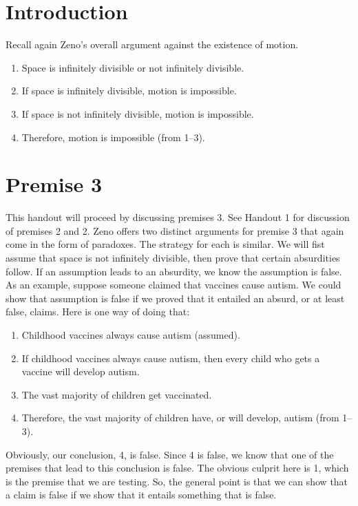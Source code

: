 \documentclass[oneside]{article}
\begin{document}
\thispagestyle{fancy}



\section{Introduction}

Recall again Zeno's overall argument against the existence of motion. 

\begin{enumerate}
\item Space is infinitely divisible or not infinitely divisible.
\item  If space is infinitely divisible, motion is impossible.
\item  If space is not infinitely divisible, motion is impossible.
\item  Therefore, motion is impossible (from 1--3).
\end{enumerate}

\section{Premise 3}\label{premise-3}

This handout will proceed by discussing premises 3. See Handout 1 for discussion of premises 2 and 2. Zeno offers two distinct arguments for premise 3 that again come in the form of paradoxes. The strategy for each is similar. We will fist assume that space is not infinitely divisible,
then prove that certain absurdities follow. If an assumption leads to an
absurdity, we know the assumption is false. As an example, suppose someone claimed that vaccines cause autism. We could show that assumption is false if we proved that it entailed an absurd, or at least false, claims. Here is one way of doing that: 

\begin{enumerate}
\item  Childhood vaccines always cause autism (assumed). 
\item If childhood vaccines always cause autism, then every child who gets a vaccine will develop autism. 
\item The vast majority of children get vaccinated. 
\item Therefore, the vast majority of children have, or will develop, autism (from 1--3). 
\end{enumerate}
Obviously, our conclusion, 4, is false. Since 4 is false, we know that one of the premises that lead to this conclusion is false. The obvious culprit here is 1, which is the premise that we are testing. So, the general point is that we can show that a claim is false if we show that it entails something that is  false. 
\end{document}
